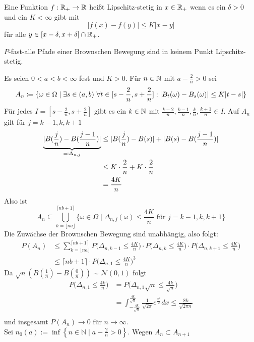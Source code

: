 \documentclass[a4paper,twoside,DIV15,BCOR12mm]{scrbook}
\begin{document}
\begin{definition}
Eine Funktion $f:\mathbb{R}_{+}\to \mathbb{R}$ heißt Lipschitz-stetig in $x\in\mathbb{R}_+$ wenn es ein $\delta>0$ und ein $K<\infty$ gibt mit
\[ |f(x)-f(y)| \le K|x-y|\]
für alle $y\in[x-\delta,x+\delta]\cap\mathbb{R}_+$.
\end{definition}

\begin{satz}
\label{satz:11.2}
$P$-fast-alle Pfade einer Brownschen Bewegung sind in keinem Punkt Lipschitz-stetig.
\end{satz}
\begin{beweis}
Es seien $0<a<b<\infty$ fest und $K>0$. Für $n\in\mathbb{N}$ mit $a-\frac 2n>0$ sei 
\[
A_n \da \{\omega\in \Omega\mid \exists s\in (a,b)\ \forall t\in[s-\frac2n,s+\frac2n]: |B_t(\omega) - B_s(\omega)| \le K|t-s|\}
\]
Für jedes $I=[s-\frac2n,s+\frac2n]$ gibt es ein $k\in\mathbb{N}$ mit $\frac{k-2}n,\frac{k-1}n,\frac kn,\frac{k+1}n\in I$. Auf $A_n$ gilt für $j=k-1,k,k+1$
\begin{align*}
\underbrace{|B(\frac jn)-B(\frac {j-1}n)|}_{\ad \Delta_{n,j}} &\le | B(\frac jn) - B(s)| + |B(s) - B(\frac {j-1}n)| \\
&\le K\cdot \frac 2n + K\cdot \frac 2n\\
&= \frac{4K}n
\end{align*}
Also ist 
\[
A_n\subseteq \bigcup_{k=\lfloor na\rfloor}^{\lceil nb+1\rceil} \{\omega\in \Omega\mid \Delta_{n,j}(\omega) \le \frac{4K}n\text{ für }j=k-1,k,k+1\}
\]
Die Zuwächse der Brownschen Bewegung sind unabhängig, also folgt:
\begin{align*}
P(A_n) &\le \sum_{k=\lfloor na\rfloor}^{\lceil nb+1\rceil} P\Big(\Delta_{n,k-1}\le \frac{4K}n\Big)\cdot P\Big(\Delta_{n,k}\le \frac{4K}n\Big)\cdot P\Big(\Delta_{n,k+1}\le \frac{4K}n\Big) \\
&\le {\lceil nb+1\rceil}\cdot P\Big(\Delta_{n,1}\le \frac{4K}n\Big)^3
\end{align*}
Da $\sqrt{n}(B(\frac{1}{n})-B(\frac{0}{n}))\sim\mathcal N(0,1)$ folgt
\begin{align*}
  P\Big(\Delta_{n,1}\leq\frac{4k}{n}\Big) &=P\Big(\Delta_{n,1}\sqrt{n}\leq\frac{4k}{\sqrt{n}}\Big) \\
  &=\int_{-\frac{4k}{\sqrt{n}}}^{\frac{4k}{\sqrt{n}}}\frac{1}{\sqrt{2\pi}}e^{\frac{x^2}{2}}dx\leq\frac{8k}{\sqrt{2\pi n}} \\
\end{align*}
und insgesamt $P(A_n)\longrightarrow 0$ für $n\longrightarrow\infty$. \\
Sei $n_0(a):=\inf\left\{n\in\mathbb N\mid a-\frac{2}{n} > 0\right\}$. Wegen $A_n\subset A_{n+1}$

\end{beweis}
\end{document}
